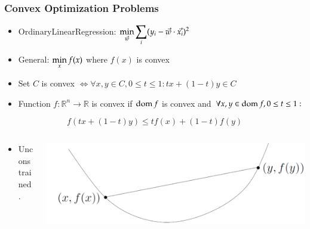 \subsection{}
\begin{frame}
\frametitle{Convex Optimization Problems}


\begin{itemize}
\item OrdinaryLinearRegression: $\displaystyle \min_{\vec{w}}\sum_i(y_i -
  \vec{w} \cdot \vec{x_i})^2$
\item General: $\displaystyle \min_xf(x)$ where $f(x)$ is convex
\item Set $C$ is convex $\Longleftrightarrow \forall x, y\in C, 0\le t
  \le 1: tx +(1 - t)y \in C$
\item Function $f : \mathbb{R}^n \rightarrow \mathbb{R}$ is convex if
  $\operatorname{dom} f$ is convex and $\forall x, y \in \operatorname{dom} f, 0\le t \le 1:$

\end{itemize}

\vspace{-4mm}

{\small
$$f(tx + (1 - t)y) \le tf(x) + (1 - t)f(y)$$
}

\vspace{-4mm}

\begin{columns}
  \begin{column}{0.5\textwidth}

\begin{itemize}
\item Unconstrained.
\end{itemize}

  \end{column}

  \begin{column}{0.5\textwidth}
\includegraphics[scale=0.2]{pics/uncons.png}
  \end{column}
\end{columns}

\end{frame}

